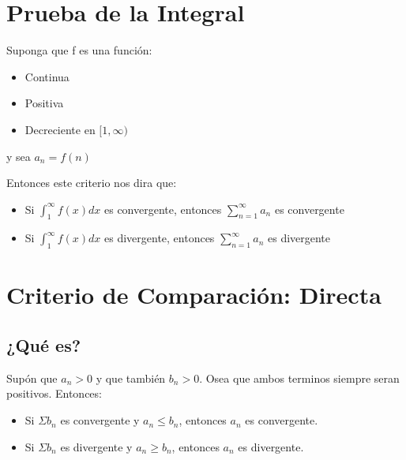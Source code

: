 \documentclass[12pt]{report}							    %
\begin{document}
    \clearpage
    \section{Prueba de la Integral}
    Suponga que f es una función:

    \begin{itemize}
        \item Continua
        \item Positiva
        \item Decreciente en $[1, \infty)$
    \end{itemize}

    y sea $a_n = f(n)$

    Entonces este criterio nos dira que:
    \begin{itemize}
       \item Si $\int_1^{\infty}f(x) dx$ es convergente, entonces $\sum_{n=1}^{\infty} a_n$ es convergente
       \item Si $\int_1^{\infty}f(x) dx$ es divergente, entonces $\sum_{n=1}^{\infty} a_n$ es divergente
    \end{itemize}





    \clearpage
    \section{Criterio de Comparación: Directa}


    \subsection{¿Qué es?}
    Supón que $a _n > 0$ y que también $b_n > 0$. Osea que ambos terminos siempre seran positivos.
    Entonces:

    \begin{itemize}
        \item Si $\Sigma b_n$ es convergente y $a_n \leq b_n$, entonces $a_n$ es convergente. 
        \item Si $\Sigma b_n$ es divergente y $a_n \geq b_n$, entonces $a_n$ es divergente. 
    \end{itemize}
\end{document}
